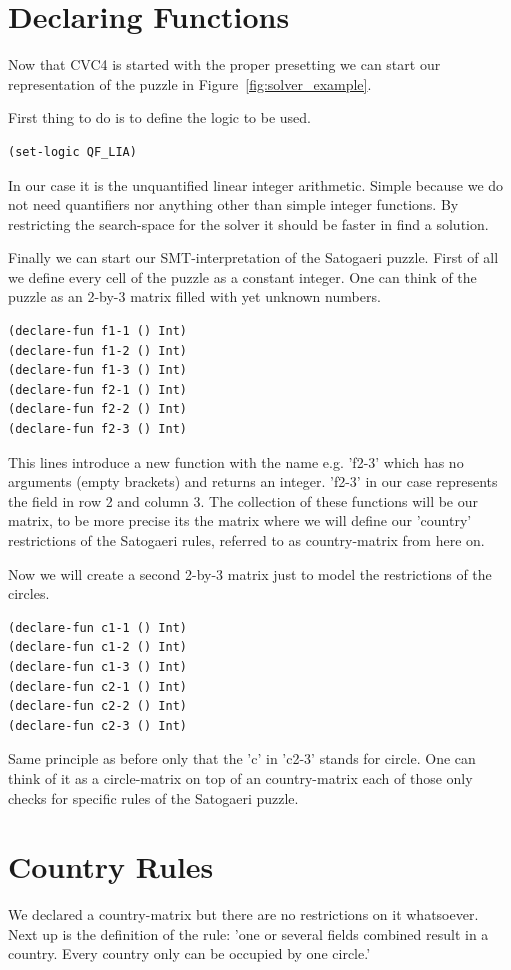 \section{Declaring Functions}
Now that CVC4 is started with the proper presetting we can start our representation of the puzzle in Figure~\ref{fig:solver_example}.

First thing to do is to define the logic to be used.
\begin{lstlisting}
(set-logic QF_LIA)
\end{lstlisting}
In our case it is the unquantified linear integer arithmetic. Simple because we do not need quantifiers nor anything other than simple integer functions. By restricting the search-space for the solver it should be faster in find a solution.

Finally we can start our SMT-interpretation of the Satogaeri puzzle. First of all we define every cell of the puzzle as a constant integer. One can think of the puzzle as an 2-by-3 matrix filled with yet unknown numbers.
\begin{lstlisting}
(declare-fun f1-1 () Int)
(declare-fun f1-2 () Int)
(declare-fun f1-3 () Int)
(declare-fun f2-1 () Int)
(declare-fun f2-2 () Int)
(declare-fun f2-3 () Int)
\end{lstlisting}
This lines introduce a new function with the name e.g. 'f2-3' which has no arguments (empty brackets) and returns an integer. 'f2-3' in our case represents the field in row 2 and column 3. The collection of these functions will be our matrix, to be more precise its the matrix where we will define our 'country' restrictions of the Satogaeri rules, referred to as country-matrix from here on.

Now we will create a second 2-by-3 matrix just to model the restrictions of the circles.
\begin{lstlisting}
(declare-fun c1-1 () Int)
(declare-fun c1-2 () Int)
(declare-fun c1-3 () Int)
(declare-fun c2-1 () Int)
(declare-fun c2-2 () Int)
(declare-fun c2-3 () Int)
\end{lstlisting}
Same principle as before only that the 'c' in 'c2-3' stands for circle.
One can think of it as a circle-matrix on top of an country-matrix each of those only checks for specific rules of the Satogaeri puzzle.

\section{Country Rules}
We declared a country-matrix but there are no restrictions on it whatsoever. Next up is the definition of the rule: 'one or several fields combined result in a country. Every country only can be occupied by one circle.'


